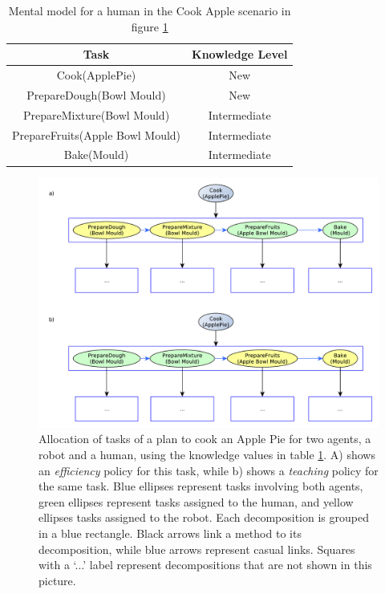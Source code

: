  
 \begin{table}
\centering
\scriptsize
\renewcommand{\arraystretch}{1.3}
\begin{tabular}{|c|c|}
\hline
Task & Knowledge Level \\ \hline \hline
Cook(ApplePie) & New \\ \hline
PrepareDough(Bowl Mould) & New \\ \hline
PrepareMixture(Bowl Mould) & Intermediate \\ \hline
PrepareFruits(Apple Bowl Mould) & Intermediate \\ \hline
Bake(Mould) & Intermediate \\ 
\hline
\end{tabular}
\caption[Mental model for a human in the Cook Apple
 scenario.]{Mental model for a human in the Cook Apple
 scenario in figure \ref{fig:knowledge-adapting_plan_knowledge} }
 \label{table:knowledge-apple_pie_human_knowledge}    
\end{table}



\begin{figure}[ht!]
 \centering
  \includegraphics[scale=0.5]{img/teacher/adapting_plan_knowledge.pdf}
 \caption[Allocation of tasks of a plan to cook an Apple Pie for two agents]{Allocation of tasks of a plan to cook an Apple Pie for two agents, a robot and a human, using the knowledge values in table \ref{table:knowledge-apple_pie_human_knowledge}. A) shows an \textit{efficiency} policy for this task, while b) shows a \textit{teaching} policy for the same task. Blue ellipses represent tasks involving both agents, green ellipses represent tasks assigned to the human, and yellow ellipses tasks assigned to the robot. Each decomposition is grouped in a blue rectangle. Black arrows link a method to its decomposition, while blue arrows represent casual links. Squares with a `...' label represent decompositions that are not shown in this picture.}
 \label{fig:knowledge-adapting_plan_knowledge}
 \end{figure}



